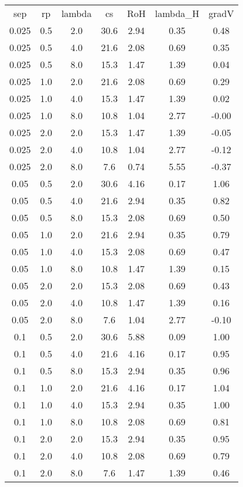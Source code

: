 \begin{table}
\begin{tabular}{ccccccc}
sep & rp & lambda & cs & RoH & lambda_H & gradV \\
0.025 & 0.5 & 2.0 & 30.6 & 2.94 & 0.35 & 0.48 \\
0.025 & 0.5 & 4.0 & 21.6 & 2.08 & 0.69 & 0.35 \\
0.025 & 0.5 & 8.0 & 15.3 & 1.47 & 1.39 & 0.04 \\
0.025 & 1.0 & 2.0 & 21.6 & 2.08 & 0.69 & 0.29 \\
0.025 & 1.0 & 4.0 & 15.3 & 1.47 & 1.39 & 0.02 \\
0.025 & 1.0 & 8.0 & 10.8 & 1.04 & 2.77 & -0.00 \\
0.025 & 2.0 & 2.0 & 15.3 & 1.47 & 1.39 & -0.05 \\
0.025 & 2.0 & 4.0 & 10.8 & 1.04 & 2.77 & -0.12 \\
0.025 & 2.0 & 8.0 & 7.6 & 0.74 & 5.55 & -0.37 \\
0.05 & 0.5 & 2.0 & 30.6 & 4.16 & 0.17 & 1.06 \\
0.05 & 0.5 & 4.0 & 21.6 & 2.94 & 0.35 & 0.82 \\
0.05 & 0.5 & 8.0 & 15.3 & 2.08 & 0.69 & 0.50 \\
0.05 & 1.0 & 2.0 & 21.6 & 2.94 & 0.35 & 0.79 \\
0.05 & 1.0 & 4.0 & 15.3 & 2.08 & 0.69 & 0.47 \\
0.05 & 1.0 & 8.0 & 10.8 & 1.47 & 1.39 & 0.15 \\
0.05 & 2.0 & 2.0 & 15.3 & 2.08 & 0.69 & 0.43 \\
0.05 & 2.0 & 4.0 & 10.8 & 1.47 & 1.39 & 0.16 \\
0.05 & 2.0 & 8.0 & 7.6 & 1.04 & 2.77 & -0.10 \\
0.1 & 0.5 & 2.0 & 30.6 & 5.88 & 0.09 & 1.00 \\
0.1 & 0.5 & 4.0 & 21.6 & 4.16 & 0.17 & 0.95 \\
0.1 & 0.5 & 8.0 & 15.3 & 2.94 & 0.35 & 0.96 \\
0.1 & 1.0 & 2.0 & 21.6 & 4.16 & 0.17 & 1.04 \\
0.1 & 1.0 & 4.0 & 15.3 & 2.94 & 0.35 & 1.00 \\
0.1 & 1.0 & 8.0 & 10.8 & 2.08 & 0.69 & 0.81 \\
0.1 & 2.0 & 2.0 & 15.3 & 2.94 & 0.35 & 0.95 \\
0.1 & 2.0 & 4.0 & 10.8 & 2.08 & 0.69 & 0.79 \\
0.1 & 2.0 & 8.0 & 7.6 & 1.47 & 1.39 & 0.46 \\
\end{tabular}
\end{table}
